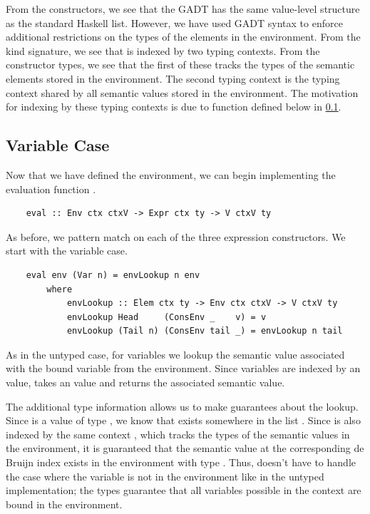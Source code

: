 From the constructors, we see that the  GADT has the same value-level structure as the standard Haskell list. However, we have used GADT syntax to enforce additional restrictions on the types of the elements in the environment. From the kind signature, we see that  is indexed by two typing contexts. From the constructor types, we see that the first of these tracks the types of the semantic elements stored in the environment. The second typing context is the typing context shared by all semantic values stored in the environment. The motivation for indexing  by these typing contexts is due to  function defined below in \ref{subsect:typedetaExpandCase}.



\subsection{Variable Case}
\label{subsect:typedetaExpandCase}

Now that we have defined the environment, we can begin implementing the evaluation function .

\begin{lstlisting}
    eval :: Env ctx ctxV -> Expr ctx ty -> V ctxV ty
\end{lstlisting}

As before, we pattern match on each of the three expression constructors. We start with the variable case.

\begin{lstlisting}
    eval env (Var n) = envLookup n env
        where
            envLookup :: Elem ctx ty -> Env ctx ctxV -> V ctxV ty 
            envLookup Head     (ConsEnv _    v) = v
            envLookup (Tail n) (ConsEnv tail _) = envLookup n tail
\end{lstlisting}

As in the untyped case, for variables we lookup the semantic value associated with the bound variable from the environment. Since variables are indexed by an  value,  takes an  value and returns the associated semantic value.

The additional type information allows us to make guarantees about the lookup. Since  is a value of type , we know that  exists somewhere in the list . Since  is also indexed by the same context , which tracks the types of the semantic values in the environment, it is guaranteed that the semantic value at the corresponding de Bruijn index exists in the environment with type . Thus,  doesn't have to handle the case where the variable is not in the environment like in the untyped implementation; the types guarantee that all variables possible in the context  are bound in the environment.

